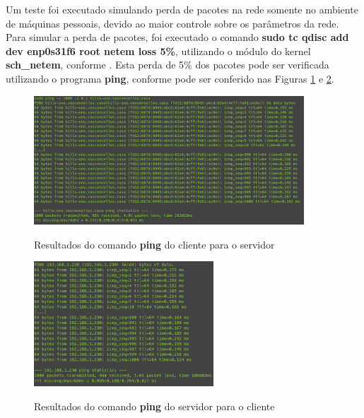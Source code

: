 Um teste foi executado simulando perda de pacotes na rede somente no ambiente de máquinas pessoais, devido ao maior controle sobre os parâmetros da rede. Para simular a perda de pacotes, foi executado o comando \textbf{sudo tc qdisc add dev enp0s31f6 root netem loss 5\%}, utilizando o módulo do kernel \textbf{sch\_netem}, conforme \cite{cardwell_networkingnetem_2021}. Esta perda de 5\% dos pacotes pode ser verificada utilizando o programa \textbf{ping}, conforme pode ser conferido nas Figuras \ref{fig:client_to_server} e \ref{fig:server_to_client}.

\begin{figure}[ht]
    \centering
    \caption{Resultados do comando \textbf{ping} do cliente para o servidor}
    \includegraphics[width=0.9\textwidth]{figuras/transporte/client_to_server.png} 
    \label{fig:client_to_server}
\end{figure}

\begin{figure}[ht]
    \centering
    \caption{Resultados do comando \textbf{ping} do servidor para o cliente}
    \includegraphics[width=0.6\textwidth]{figuras/transporte/server_to_client.png} 
    \label{fig:server_to_client}
\end{figure}

